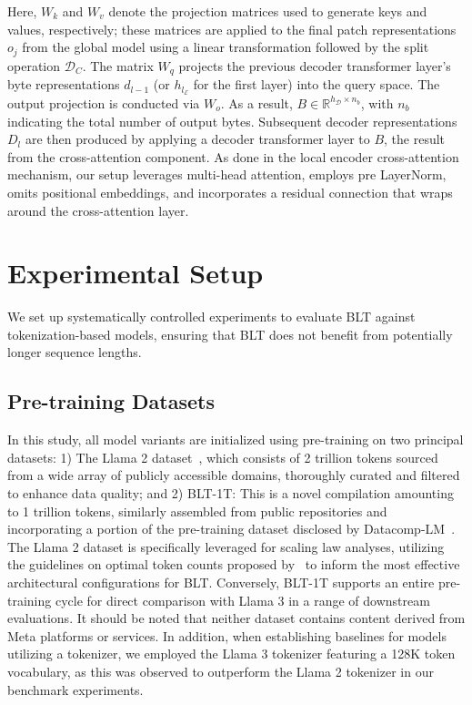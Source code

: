 Here, $W_k$ and $W_v$ denote the projection matrices used to generate keys and values, respectively; these matrices are applied to the final patch representations $o_j$ from the global model using a linear transformation followed by the split operation $\mathcal{D}_C$. The matrix $W_q$ projects the previous decoder transformer layer’s byte representations $d_{l-1}$ (or $h_{l_{\mathcal{E}}}$ for the first layer) into the query space. The output projection is conducted via $W_o$. As a result, $B \in \mathbb{R}^{h_{\mathcal{D}} \times n_b}$, with $n_b$ indicating the total number of output bytes. Subsequent decoder representations $D_l$ are then produced by applying a decoder transformer layer to $B$, the result from the cross-attention component. As done in the local encoder cross-attention mechanism, our setup leverages multi-head attention, employs pre LayerNorm, omits positional embeddings, and incorporates a residual connection that wraps around the cross-attention layer.

\section{Experimental Setup}
\label{section:experiments}
We set up systematically controlled experiments to evaluate {\textsc BLT} against tokenization-based models, ensuring that {\textsc BLT} does not benefit from potentially longer sequence lengths.

\subsection{Pre-training Datasets} In this study, all model variants are initialized using pre-training on two principal datasets: 1) The Llama 2 dataset~\citep{touvron2023llama}, which consists of 2 trillion tokens sourced from a wide array of publicly accessible domains, thoroughly curated and filtered to enhance data quality; and 2) {\textsc BLT}-1T: This is a novel compilation amounting to 1 trillion tokens, similarly assembled from public repositories and incorporating a portion of the pre-training dataset disclosed by Datacomp-LM~\citep{li2024datacomp}. The Llama 2 dataset is specifically leveraged for scaling law analyses, utilizing the guidelines on optimal token counts proposed by~\cite{dubey2024llama} to inform the most effective architectural configurations for {\textsc BLT}. Conversely, {\textsc BLT}-1T supports an entire pre-training cycle for direct comparison with Llama 3 in a range of downstream evaluations. It should be noted that neither dataset contains content derived from Meta platforms or services. In addition, when establishing baselines for models utilizing a tokenizer, we employed the Llama 3 tokenizer featuring a 128K token vocabulary, as this was observed to outperform the Llama 2 tokenizer in our benchmark experiments.

